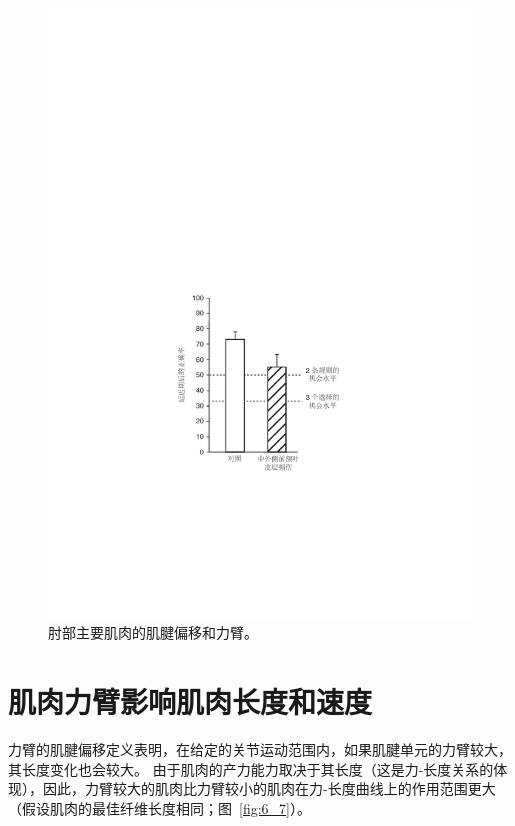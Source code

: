 \begin{figure}[!htb]
	\centering
	\includegraphics[width=1.0\linewidth]{chap6/6_6}
	\caption{肘部主要肌肉的肌腱偏移和力臂\cite{murray1995variation}。 \label{fig:6_6}}
\end{figure}


\section{肌肉力臂影响肌肉长度和速度}

力臂的肌腱偏移定义表明，在给定的关节运动范围内，如果肌腱单元的力臂较大，其长度变化也会较大。
由于肌肉的产力能力取决于其长度（这是力-长度关系的体现），因此，力臂较大的肌肉比力臂较小的肌肉在力-长度曲线上的作用范围更大（假设肌肉的最佳纤维长度相同；图~\ref{fig:6_7}）。

